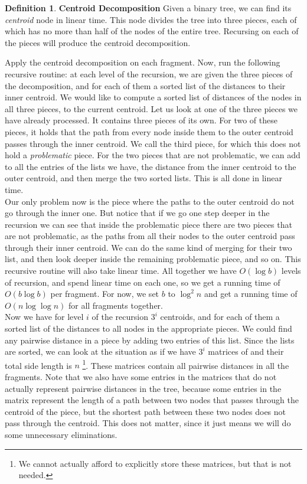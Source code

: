 \documentclass[11pt,a4paper]{article}
\theoremstyle{definition}
\newtheorem{definition}{Definition}
\theoremstyle{remark}
\begin{document}
\begin{definition} \textbf{Centroid Decomposition} %
Given a binary tree, we can find its \textit{centroid} node in linear time. This node divides the tree into three pieces, each of which has no more than half of the nodes of the entire tree. Recursing on each of the pieces will produce the centroid decomposition.
\end{definition}
Apply the centroid decomposition on each fragment. Now, run the following recursive routine: at each level of the recursion, we are given the three pieces of the decomposition, and for each of them a sorted list of the distances to their inner centroid. We would like to compute a sorted list of distances of the nodes in all three pieces, to the current centroid. Let us look at one of the three pieces we have already processed. It contains three pieces of its own. For two of these pieces, it holds that the path from every node inside them to the outer centroid passes through the inner centroid. We call the third piece, for which this does not hold a \textit{problematic} piece. For the two pieces that are not problematic, we can add to all the entries of the lists we have, the distance from the inner centroid to the outer centroid, and then merge the two sorted lists. This is all done in linear time.\\
Our only problem now is the piece where the paths to the outer centroid do not go through the inner one. But notice that if we go one step deeper in the recursion we can see that inside the problematic piece there are two pieces that are not problematic, as the paths from all their nodes to the outer centroid pass through their inner centroid. We can do the same kind of merging for their two list, and then look deeper inside the remaining problematic piece, and so on. This recursive routine will also take linear time. All together we have $O(\log b)$ levels of recursion, and spend linear time on each one, so we get a running time of $O(b \log b)$ per fragment. For now, we set $b$ to $\log ^2 n$ and get a running time of $O(n \log \log n)$ for all fragments together.\\
Now we have for level $i$ of the recursion $3^i$ centroids, and for each of them a sorted list of the distances to all nodes in the appropriate pieces. We could find any pairwise distance in a piece by adding two entries of this list. Since the lists are sorted, we can look at the situation as if we have $3^i$ matrices of and their total side length is $n$ \footnote{We cannot actually afford to explicitly store these matrices, but that is not needed.}. These matrices contain all pairwise distances in all the fragments. Note that we also have some entries in the matrices that do not actually represent pairwise distances in the tree, because some entries in the matrix represent the length of a path between two nodes that passes through the centroid of the piece, but the shortest path between these two nodes does not pass through the centroid. This does not matter, since it just means we will do some unnecessary eliminations.
\end{document}
